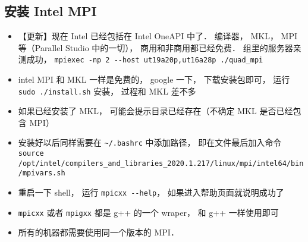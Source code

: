 \subsection{安装 Intel MPI}
\begin{itemize}
\item 【更新】现在 Intel 已经包括在 Intel OneAPI 中了． 编译器， MKL， MPI 等（Parallel Studio 中的一切）， 商用和非商用都已经免费． 组里的服务器亲测成功， \verb|mpiexec -np 2 --host ut19a20p,ut16a28p ./quad_mpi|
\item intel MPI 和 MKL 一样是免费的， google 一下， 下载安装包即可， 运行 \verb`sudo ./install.sh` 安装， 过程和 MKL 差不多
\item 如果已经安装了 MKL， 可能会提示目录已经存在（不确定 MKL 是否已经包含 MPI）
\item 安装好以后同样需要在 \verb`~/.bashrc` 中添加路径， 即在文件最后加入命令 \verb`source /opt/intel/compilers_and_libraries_2020.1.217/linux/mpi/intel64/bin/mpivars.sh`
\item 重启一下 shell， 运行 \verb`mpicxx --help`， 如果进入帮助页面就说明成功了
\item \verb`mpicxx` 或者 \verb`mpigxx` 都是 g++ 的一个 wraper， 和 g++ 一样使用即可
\item 所有的机器都需要使用同一个版本的 MPI．
\end{itemize}


